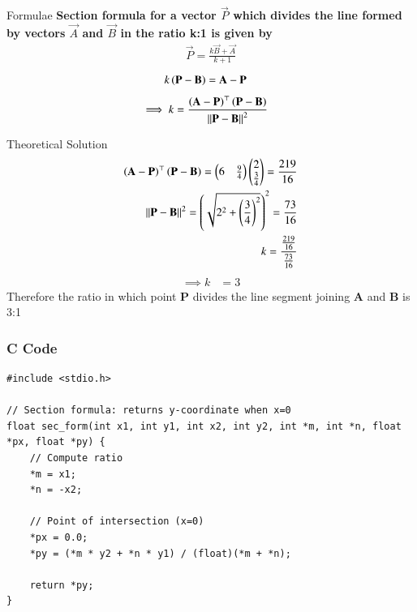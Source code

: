 \documentclass{beamer}
\begin{document}
 \begin{frame}{Formulae}
\textbf{Section formula for a vector $\vec{P}$ which divides the line formed by vectors $\vec{A}$ and $\vec{B}$ in the ratio k:1 is given by}
\begin{align}
    \vec{P}=\frac{k\vec{B}+\vec{A}}{k+1}
\end{align}
\begin{align}
			k\left(\mathbf{P}-\mathbf{B}\right)&= \mathbf{A}-\mathbf{P}
\end{align}
\begin{align}\implies k &=
			\frac{\left(\mathbf{A}-\mathbf{P}\right)^{\top}\left(\mathbf{P}-\mathbf{B}\right)}{\left\lVert\mathbf{P}-\mathbf{B}\right\rVert^2}
			\label{eq:section_formula-k}
\end{align}
\end{frame}

\begin{frame}{Theoretical Solution}
\begin{align}
\left(\mathbf{A}-\mathbf{P}\right)^{\top}\left(\mathbf{P}-\mathbf{B}\right) =\begin{pmatrix}6 & \frac{9}{4}\end{pmatrix}\begin{pmatrix}2\\ \frac{3}{4}
\end{pmatrix}=\frac{219}{16}\\
{\left\lVert\mathbf{P}-\mathbf{B}\right\rVert^2} = \left(\sqrt{2^2 + {\left(\frac{3}{4}\right)}^2}\right)^2 = \frac{73}{16}\\
k=\frac{\frac{219}{16}}{\frac{73}{16}}
\end{align}
 \begin{align}
\implies k &= 3
\end{align}
 Therefore the ratio in which point \textbf{P} divides the line segment joining \textbf{A} and \textbf{B} is 3:1
\end{frame}

\begin{frame}[fragile]
    \frametitle{C Code }

    \begin{lstlisting}
#include <stdio.h>

// Section formula: returns y-coordinate when x=0
float sec_form(int x1, int y1, int x2, int y2, int *m, int *n, float *px, float *py) {
    // Compute ratio
    *m = x1;
    *n = -x2;

    // Point of intersection (x=0)
    *px = 0.0;
    *py = (*m * y2 + *n * y1) / (float)(*m + *n);

    return *py;
}

\end{lstlisting}
\end{frame}
\end{document}
